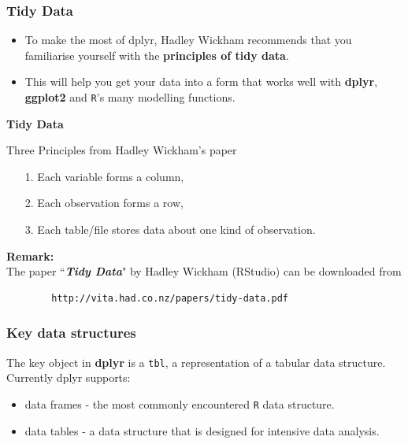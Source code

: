 \documentclass{beamer}
\begin{document}
	\begin{frame}
		\frametitle{Tidy Data}
		\Large
		\vspace{-1cm}
		\begin{itemize}
			
			\item To make the most of dplyr, Hadley Wickham recommends that you familiarise yourself with the \textbf{principles of tidy data}. 
			\item This will help you get your data into a form that works well with \textbf{dplyr}, \textbf{ggplot2} and \texttt{R}'s many modelling functions.
		\end{itemize}
	\end{frame}
	
	\begin{frame}[fragile]
		\textbf{Tidy Data}
		\begin{framed}
			\noindent Three Principles from Hadley Wickham's paper
			\begin{itemize}
				\item[1.] Each variable forms a column, 
				\item[2.] Each observation forms a row, 
				\item[3.] Each table/file stores data about one kind of observation.
			\end{itemize}
		\end{framed}
		\noindent \textbf{Remark:} \\  The paper ``\textit{\textbf{Tidy Data}}" by Hadley Wickham (RStudio) can be downloaded from 
		\begin{verbatim}
		http://vita.had.co.nz/papers/tidy-data.pdf
		\end{verbatim}
	\end{frame}
	\begin{frame}
		\frametitle{Key data structures}
		\Large
		The key object in \textbf{dplyr} is a \texttt{tbl}, a representation of a tabular data structure. Currently dplyr supports:
		
		\begin{itemize}
			\item data frames - the  most commonly encountered \texttt{R} data structure. 
			\item data tables - a data structure that is designed for intensive data analysis.
		\end{itemize}
		
	\end{frame}
\end{document}
